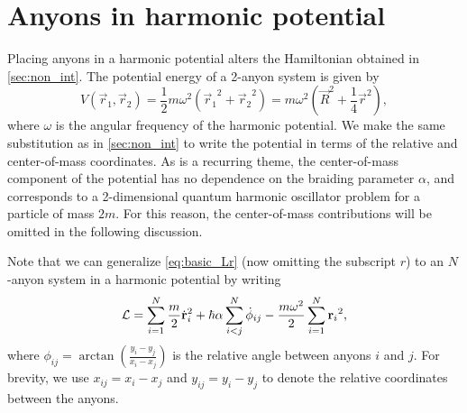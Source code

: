 \section{Anyons in harmonic potential}\label{sec:mult_harmonic}

Placing anyons in a harmonic potential alters the Hamiltonian obtained in \cref{sec:non_int}. The potential energy of a 2-anyon system is given by
\begin{equation}
    V(\vec{r}_1,\vec{r}_2) = \frac{1}{2}m\omega^2\left( {\vec{r}_1}^{2} + {\vec{r}_2}^{2} \right) = m\omega^2\left( {\vec{R}}^2 + \frac{1}{4}{\vec{r}}^{2} \right),
\end{equation}
where $\omega$ is the angular frequency of the harmonic potential. We make the same substitution as in \cref{sec:non_int} to write the potential in terms of the relative and center-of-mass coordinates. As is a recurring theme, the center-of-mass component of the potential has no dependence on the braiding parameter $\alpha$, and corresponds to a 2-dimensional quantum harmonic oscillator problem for a particle of mass $2m$. For this reason, the center-of-mass contributions will be omitted in the following discussion.

Note that we can generalize \cref{eq:basic_Lr} (now omitting the subscript $r$) to an $N$-anyon system in a harmonic potential by writing
\begin{equation}
    \mathcal{L} = \sum_{i=1}^{N}\frac{m}{2}\dot{\mathbf{r}}_i^{2} + \hbar\alpha\sum_{\substack{i<j}}^N\dot{\phi}_{ij} - \frac{m\omega^2}{2}\sum_{i=1}^{N}{\mathbf{r}_i}^{2},
\end{equation}
where $\phi_{ij} = \arctan\left( \frac{y_i-y_j}{x_i-x_j} \right)$ is the relative angle between anyons $i$ and $j$. For brevity, we use $x_{ij} = x_i-x_j$ and $y_{ij} = y_i-y_j$ to denote the relative coordinates between the anyons.

